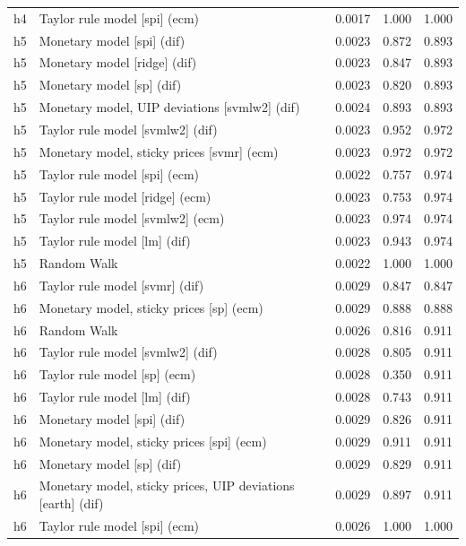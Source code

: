 \begin{ThreePartTable}
\begin{longtable}[t]{cp{5.5cm}ccc}
h4 & \raggedright Taylor rule model [spi] (ecm) & 0.0017 & 1.000 & 1.000\\
\addlinespace
h5 & \raggedright Monetary model [spi] (dif) & 0.0023 & 0.872 & 0.893\\
h5 & \raggedright Monetary model [ridge] (dif) & 0.0023 & 0.847 & 0.893\\
h5 & \raggedright Monetary model [sp] (dif) & 0.0023 & 0.820 & 0.893\\
h5 & \raggedright Monetary model, UIP deviations [svmlw2] (dif) & 0.0024 & 0.893 & 0.893\\
h5 & \raggedright Taylor rule model [svmlw2] (dif) & 0.0023 & 0.952 & 0.972\\
h5 & \raggedright Monetary model, sticky prices [svmr] (ecm) & 0.0023 & 0.972 & 0.972\\
h5 & \raggedright Taylor rule model [spi] (ecm) & 0.0022 & 0.757 & 0.974\\
h5 & \raggedright Taylor rule model [ridge] (ecm) & 0.0023 & 0.753 & 0.974\\
h5 & \raggedright Taylor rule model [svmlw2] (ecm) & 0.0023 & 0.974 & 0.974\\
h5 & \raggedright Taylor rule model [lm] (dif) & 0.0023 & 0.943 & 0.974\\
h5 & \raggedright Random Walk & 0.0022 & 1.000 & 1.000\\
\addlinespace
h6 & \raggedright Taylor rule model [svmr] (dif) & 0.0029 & 0.847 & 0.847\\
h6 & \raggedright Monetary model, sticky prices [sp] (ecm) & 0.0029 & 0.888 & 0.888\\
h6 & \raggedright Random Walk & 0.0026 & 0.816 & 0.911\\
h6 & \raggedright Taylor rule model [svmlw2] (dif) & 0.0028 & 0.805 & 0.911\\
h6 & \raggedright Taylor rule model [sp] (ecm) & 0.0028 & 0.350 & 0.911\\
h6 & \raggedright Taylor rule model [lm] (dif) & 0.0028 & 0.743 & 0.911\\
h6 & \raggedright Monetary model [spi] (dif) & 0.0029 & 0.826 & 0.911\\
h6 & \raggedright Monetary model, sticky prices [spi] (ecm) & 0.0029 & 0.911 & 0.911\\
h6 & \raggedright Monetary model [sp] (dif) & 0.0029 & 0.829 & 0.911\\
h6 & \raggedright Monetary model, sticky prices, UIP deviations [earth] (dif) & 0.0029 & 0.897 & 0.911\\
h6 & \raggedright Taylor rule model [spi] (ecm) & 0.0026 & 1.000 & 1.000\\

\end{longtable}
\end{ThreePartTable}
